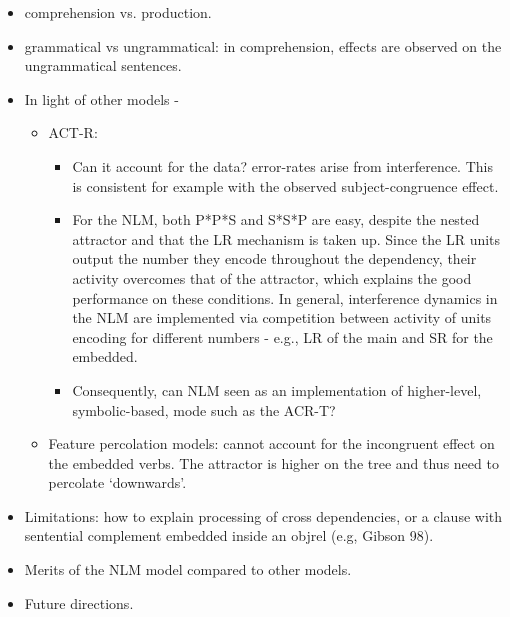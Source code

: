 \begin{itemize}
    
    \item comprehension vs. production.
    
    \item grammatical vs ungrammatical: in comprehension, effects are observed on the ungrammatical sentences. 
      
    \item In light of other models -
    \begin{itemize}
        \item ACT-R:
        \begin{itemize}    
             \item Can it account for the data? error-rates arise from interference. This is consistent for example with the observed subject-congruence effect. 
             \item For the NLM, both P*P*S and S*S*P are easy, despite the nested attractor and that the LR mechanism is taken up. Since the LR units output the number they encode throughout the dependency, their activity overcomes that of the attractor, which explains the good performance on these conditions. In general, interference dynamics in the NLM are implemented via competition between activity of units encoding for different numbers - e.g., LR of the main and SR for the embedded. 
             \item Consequently, can NLM seen as an implementation of higher-level, symbolic-based, mode such as the ACR-T?
        \end{itemize}
        
        \item Feature percolation models: cannot account for the incongruent effect on the embedded verbs. The attractor is higher on the tree and thus need to percolate `downwards'.
    \end{itemize}   

    \item Limitations: how to explain processing of cross dependencies, or a clause with sentential complement embedded inside an objrel (e.g, Gibson 98).
    \item Merits of the NLM model compared to other models.    
    
    
    \item Future directions. 
    
\end{itemize}
